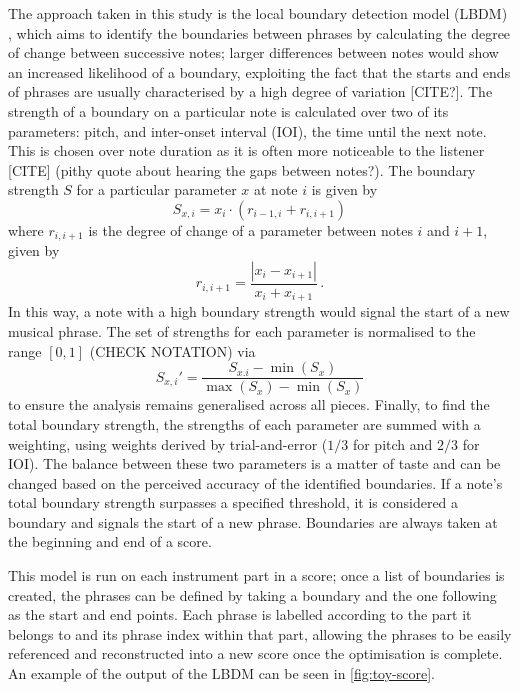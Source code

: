 \documentclass[12pt]{article}
\theoremstyle{definition}
\begin{document}
The approach taken in this study is the local boundary detection model (LBDM) \cite{cambouropoulos_lbdm_2011}, which aims to identify the boundaries between phrases by calculating the degree of change between successive notes; larger differences between notes would show an increased likelihood of a boundary, exploiting the fact that the starts and ends of phrases are usually characterised by a high degree of variation [CITE?]. The strength of a boundary on a particular note is calculated over two of its parameters: pitch, and inter-onset interval (IOI), the time until the next note. This is chosen over note duration as it is often more noticeable to the listener [CITE] (pithy quote about hearing the gaps between notes?). The boundary strength $S$ for a particular parameter $x$ at note $i$ is given by
\begin{equation}
    S_{x,i}=x_i\cdot (r_{i-1, i} + r_{i, i+1})
    \label{eq:boundary-strength}
\end{equation}
where $r_{i, i+1}$ is the degree of change of a parameter between notes $i$ and $i+1$, given by
\begin{equation}
    r_{i, i+1}=\frac{|x_{i}-x_{i+1}|}{x_{i}+x_{i+1}} \,.
    \label{eq:degree-change}
\end{equation}
In this way, a note with a high boundary strength would signal the start of a new musical phrase. The set of strengths for each parameter is normalised to the range $[0,1]$ (CHECK NOTATION) via
\begin{equation}
    S_{x,i}'=\frac{S_{x.i}-\min(S_x)}{\max(S_x)-\min(S_x)}
    \label{eq:normalisation}
\end{equation}
to ensure the analysis remains generalised across all pieces.
Finally, to find the total boundary strength, the strengths of each parameter are summed with a weighting, using weights derived by trial-and-error ($1/3$ for pitch and $2/3$ for IOI). The balance between these two parameters is a matter of taste and can be changed based on the perceived accuracy of the identified boundaries. If a note's total boundary strength surpasses a specified threshold, it is considered a boundary and signals the start of a new phrase. Boundaries are always taken at the beginning and end of a score.

This model is run on each instrument part in a score; once a list of boundaries is created, the phrases can be defined by taking a boundary and the one following as the start and end points. Each phrase is labelled according to the part it belongs to and its phrase index within that part, allowing the phrases to be easily referenced and reconstructed into a new score once the optimisation is complete. An example of the output of the LBDM can be seen in \cref{fig:toy-score}.
\end{document}
